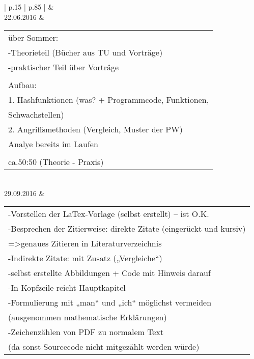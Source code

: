 \documentclass[12pt,a4paper]{scrartcl}
\begin{document}
	\begin{longtable}{| p{} | p{} |}
		\hline
		\rowcolor[HTML]{C0C0C0} 
		 &  \\ \hline
		\rowcolor[HTML]{EFEFEF} 
		22.06.2016 & \begin{tabular}[c]{@{}l@{}}über Sommer:\\ -Theorieteil (Bücher aus TU und Vorträge)\\ -praktischer Teil über Vorträge\\ \\ Aufbau:\\ 1. Hashfunktionen (was? + Programmcode, Funktionen, \\ Schwachstellen)\\ 2. Angriffsmethoden (Vergleich, Muster der PW)\\ Analye bereits im Laufen\\ \\ ca.50:50 (Theorie - Praxis)\end{tabular} \\ \hline
		29.09.2016 & \begin{tabular}[c]{@{}l@{}}-Vorstellen der LaTex-Vorlage (selbst erstellt) – ist O.K.\\ -Besprechen der Zitierweise: direkte Zitate (eingerückt und kursiv)\\ =\textgreater genaues Zitieren in Literaturverzeichnis\\ -Indirekte Zitate: mit Zusatz („Vergleiche“)\\ -selbst erstellte Abbildungen + Code mit Hinweis darauf\\ -In Kopfzeile reicht Hauptkapitel\\ -Formulierung mit „man“ und „ich“ möglichst vermeiden\\ (ausgenommen mathematische Erklärungen)\\ -Zeichenzählen von PDF zu normalem Text\\ (da sonst Sourcecode nicht  mitgezählt werden würde)\end{tabular} \\ \hline

\end{longtable}
\end{document}
